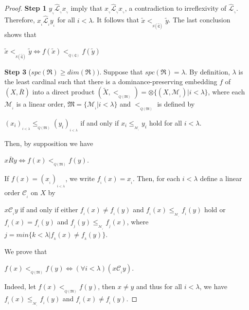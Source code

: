 \documentclass{article}
\theoremstyle{definition}
\begin{document}
\begin{proof}{\bf Step 1}
$y_{_\gamma}\widehat{\mathcal{L}}_{_\gamma} x_{_\gamma}$
imply that $x_{_\gamma}\widehat{\mathcal{L}}_{_\gamma} x_{_\gamma}$,
a contradiction to irreflexivity of 
$\widehat{\mathcal{L}}_{_\gamma}$.
Therefore, $x_{_i}\widehat{\mathcal{L}}_{_i}y_{_i}$ for all $i<\lambda$. It follows that 
$\widetilde{x} <_{_{S(\widehat{\mathfrak{L}})}} \widetilde{y}$.
The last conclusion shows that
\begin{center}
$\widetilde{x}<_{_{S(\widehat{\mathfrak{L}})}}\widetilde{y}\Leftrightarrow 
f(\widetilde{x}) <_{_{Q(\mathfrak{L})}} f(\widetilde{y})$
\end{center}
\par\smallskip\par\noindent
{\bf Step 3} ($spc(\mathfrak{R})\geq dim(\mathfrak{R}))$.
Suppose that $spc(\mathfrak{R})=\lambda$. By definition,
$\lambda$ is
the least cardinal such that there is a dominance-preserving embedding $f$ of $(X,\overline{R})$ into a direct product 
$(\widetilde{X},<_{_{Q(\mathfrak{M})}})=\otimes\{(X,\mathcal{M}_{_i})\vert i<\lambda\}$,
where each $\mathcal{M}_{_i}$ is a linear order, 
$\mathfrak{M}=\{\mathcal{M}_{_i}\vert i<\lambda\}$ 
and
$<_{_{Q(\mathfrak{M})}}$ is defined by
\begin{center}
$(x_{i})_{_{i<\lambda}}\leq_{_{Q(\mathfrak{M})}}(y_{i})_{_{i<\lambda}}$ if and only 
if $x_{i}\leq_{_{\mathcal{M}_{_i}}} y_{i}$ hold for all $i<\lambda$.
\end{center}
Then, by supposition we have 
\begin{center}
$x\overline{R}y\Leftrightarrow f(x)<_{_{Q(\mathfrak{M})}}f(y)$.
\end{center}
If $f(x)=(x_{_i})_{_{i<\lambda}}$, we write $f_{_i}(x)=x_{_i}$. Then,
for each $i<\lambda$ define a linear order $\mathcal{C}_{_i}$ on $X$ by 
\begin{center}
$x \mathcal{C}_{_i} y$ if and only if either $f_{_i}(x)\neq f_{_i}(y)$ and 
$f_{_i}(x)\leq_{_{\mathcal{M}_{_i}}}f_{_i}(y)$ hold or 
$f_{_i}(x)=f_{_i}(y)$ and $f_{_j}(y)\leq_{_{\mathcal{M}_{_j}}}f_{_j}(x)$, where \\
$j=min\{k<\lambda\vert f_{_k}(x)\neq f_{_k}(y)\}$. 
\end{center}
We prove that
\begin{center}
 $f(x)<_{_{Q(\mathfrak{M})}}f(y)\Leftrightarrow (\forall i<\lambda) (x\mathcal{C}_{_i}y)$. 
 \end{center}
 Indeed, let $f(x)<_{_{Q(\mathfrak{M})}}f(y)$, then $x\neq y$ and thus for all $i<\lambda$, we have 
$f_{_i}(x)\leq_{_{\mathcal{M}_{_i}}} f_{_i}(y)$ and $f_{_i}(x)\neq f_{_i}(y)$. 

\end{proof}
\end{document}
